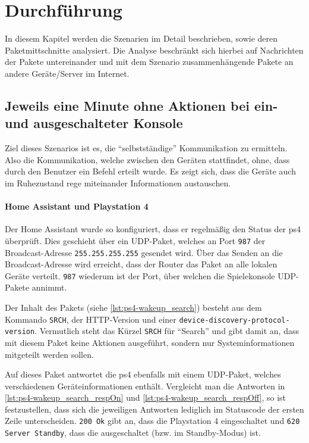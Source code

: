 \newpage
\section{Durchführung}\label{sec:durchfuehrung}
In diesem Kapitel werden die Szenarien im Detail beschrieben,
sowie deren Paketmittschnitte analysiert.
Die Analyse beschränkt sich hierbei auf Nachrichten der Pakete untereinander
und mit dem Szenario zusammenhängende Pakete an andere Geräte/Server im Internet.

\subsection{Jeweils eine Minute ohne Aktionen bei ein- und ausgeschalteter Konsole}\label{sec:durchfuehrung-aus}
Ziel dieses Szenarios ist es,
die \enquote{selbstständige} Kommunikation zu ermitteln.
Also die Kommunikation, welche zwischen den Geräten stattfindet, ohne, dass durch den Benutzer ein Befehl erteilt wurde.
Es zeigt sich, dass die Geräte auch im Ruhezustand rege miteinander Informationen austauschen.

\paragraph{Home Assistant und Playstation 4}
Der Home Assistant wurde so konfiguriert,
dass er regelmäßig den Status der \ac{ps4} überprüft.
Dies geschieht über ein UDP-Paket,
welches an Port \texttt{987} der Broadcast-Adresse \texttt{255.255.255.255} gesendet wird.
Über das Senden an die Broadcast-Adresse wird erreicht,
dass der Router das Paket an alle lokalen Geräte verteilt.
\texttt{987} wiederum ist der Port, über welchen die Spielekonsole UDP-Pakete annimmt.

Der Inhalt des Pakets (siehe \autoref{lst:ps4-wakeup_search}) besteht aus dem Kommando \texttt{SRCH},
der HTTP-Version und einer \texttt{device-discovery-protocol-version}.
Vermutlich steht das Kürzel \texttt{SRCH} für \enquote{Search} und gibt damit an,
dass mit diesem Paket keine Aktionen ausgeführt,
sondern nur Systeminformationen mitgeteilt werden sollen.



Auf dieses Paket antwortet die \ac{ps4} ebenfalls mit einem UDP-Paket,
welches verschiedenen Geräteinformationen enthält.
Vergleicht man die Antworten in \autoref{lst:ps4-wakeup_search_respOn} und \autoref{lst:ps4-wakeup_search_respOff},
so ist festzustellen,
dass sich die jeweiligen Antworten lediglich im Statuscode der ersten Zeile unterscheiden.
\texttt{200 Ok} gibt an, dass die Playstation 4 eingeschaltet und \texttt{620 Server Standby},
dass die ausgeschaltet (bzw. im Standby-Modus) ist.

